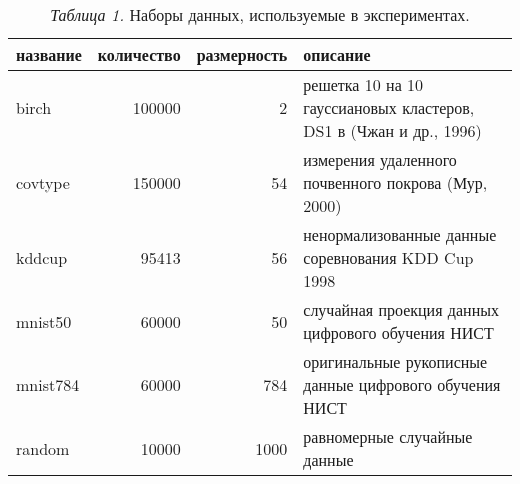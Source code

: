\begin{table}
  \footnotesize\centering
  \begin{tabular}{|l|r|r|l|} \hline
    название & количество & размерность & описание \\ \hline
    birch & 100000 & 2 & решетка 10 на 10 гауссиановых кластеров, DS1 в (Чжан и др., 1996) \\ \hline
    covtype & 150000 & 54 & измерения удаленного почвенного покрова (Мур, 2000) \\ \hline
    kddcup & 95413 & 56 & ненормализованные данные соревнования KDD Cup 1998 \\ \hline
    mnist50 & 60000 & 50 & случайная проекция данных цифрового обучения НИСТ \\ \hline
    mnist784 & 60000 & 784 & оригинальные рукописные данные цифрового обучения НИСТ \\ \hline
    random & 10000 & 1000 & равномерные случайные данные \\ \hline
  \end{tabular}
  \caption*{\footnotesize \textit{Таблица 1.} Наборы данных, используемые в экспериментах.}
  
  \vspace{2em}
  

\end{table}
